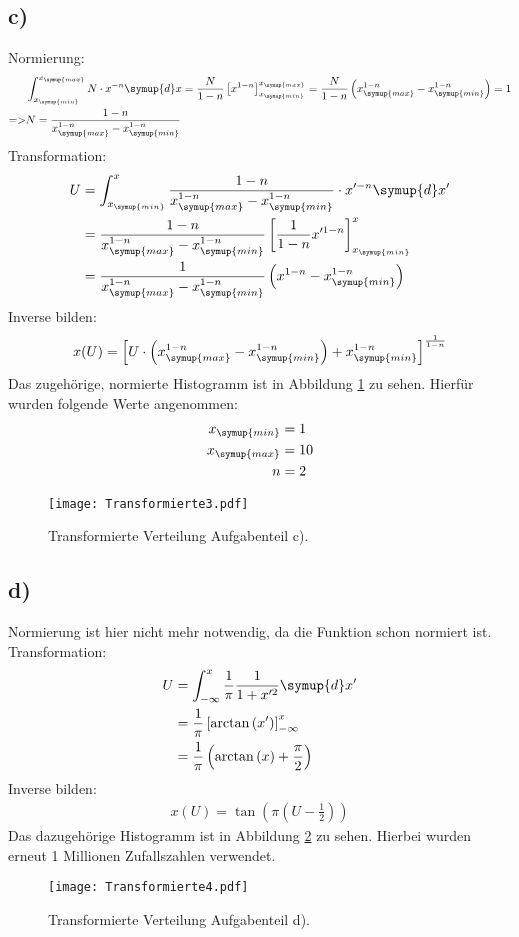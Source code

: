 \subsection{c)}
Normierung:
\begin{align*}
  &\int_{x_{\symup{min}}}^{x_{\symup{max}}} N \cdot x^{-n} \symup{d}x = \frac{N}{1-n} \left[x^{1-n} \right]_{x_{\symup{min}}}^{x_{\symup{max}}}
  = \frac{N}{1-n}\left( x_{\symup{max}}^{1-n}-x_{\symup{min}}^{1-n} \right) = 1 \\
  => & N = \frac{1-n}{x_{\symup{max}}^{1-n}-x_{\symup{min}}^{1-n}}
\end{align*}
Transformation:
\begin{align*}
  U&=\int_{x_{\symup{min}}}^x \frac{1-n}{x_{\symup{max}}^{1-n}-x_{\symup{min}}^{1-n}} \cdot x'^{-n} \symup{d}x' \\
   &= \frac{1-n}{x_{\symup{max}}^{1-n}-x_{\symup{min}}^{1-n}}\left[\frac{1}{1-n} x'^{1-n} \right]_{x_{\symup{min}}}^x \\
   &= \frac{1}{x_{\symup{max}}^{1-n}-x_{\symup{min}}^{1-n}} \left( x^{1-n}-x_{\symup{min}}^{1-n} \right)
\end{align*}
Inverse bilden:
\begin{align*}
  x(U) = \left[ U \cdot \left( x_{\symup{max}}^{1-n}-x_{\symup{min}}^{1-n} \right) + x_{\symup{min}}^{1-n}  \right]   ^{\frac{1}{1-n}}
\end{align*}
Das zugehörige, normierte Histogramm ist in Abbildung \ref{5.c} zu sehen. Hierfür wurden folgende Werte angenommen:
\begin{align*}
  x_{\symup{min}} &= 1 \\
  x_{\symup{max}} &= 10 \\
  n&=2
\end{align*}
\begin{figure}[h]
  \centering
  \texttt{[image: Transformierte3.pdf]}
  \caption{Transformierte Verteilung Aufgabenteil c).}
  \label{5.c}
\end{figure}

\subsection{d)}
Normierung ist hier nicht mehr notwendig, da die Funktion schon normiert ist.
Transformation:
\begin{align*}
  U &= \int_{-\infty}^{x} \frac{1}{\pi} \frac{1}{1+x'^2} \symup{d}x' \\
  &= \frac{1}{\pi} \left[ \arctan{(x')} \right]_{-\infty}^{x} \\
  &= \frac{1}{\pi} \left( \arctan{(x)}+ \frac{\pi}{2} \right)
\end{align*}
Inverse bilden:
\begin{align*}
  x(U) = \tan{\left( \pi \left(U-\frac{1}{2} \right) \right)}
\end{align*}
Das dazugehörige Histogramm ist in Abbildung \ref{5.d} zu sehen. Hierbei wurden erneut 1 Millionen Zufallszahlen verwendet.
\begin{figure}[h]
  \centering
  \texttt{[image: Transformierte4.pdf]}
  \caption{Transformierte Verteilung Aufgabenteil d).}
  \label{5.d}
\end{figure}

